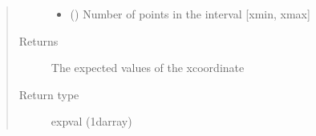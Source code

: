 \documentclass[letterpaper,12,english]{sphinxmanual}
\begin{document}
\begin{fulllineitems}
\begin{quote}
\begin{description}
\begin{itemize}
\item {} 
 () \textendash{} Number of points in the interval {[}xmin, xmax{]}

\end{itemize}

\item[{Returns}] \leavevmode
The expected values of the x\sphinxhyphen{}coordinate

\item[{Return type}] \leavevmode
expval (1darray)

\end{description}\end{quote}

\end{fulllineitems}

\end{document}
